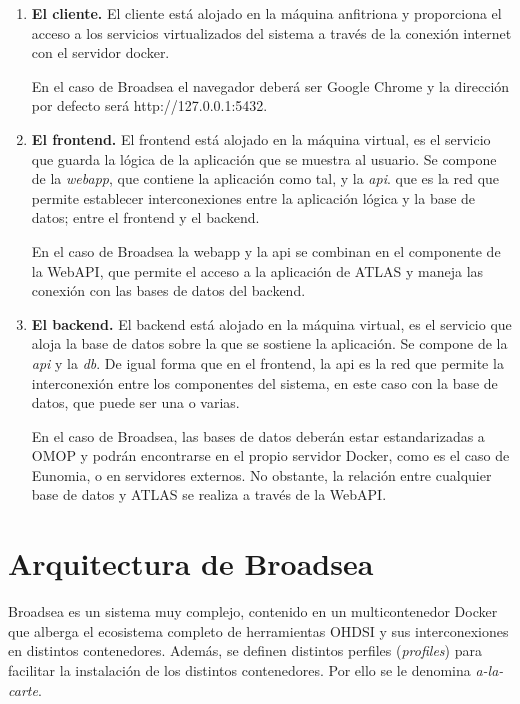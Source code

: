 \begin{enumerate}

    \item \textbf{El cliente.} El cliente está alojado en la máquina anfitriona y proporciona el acceso a los servicios virtualizados del sistema a través de la conexión internet con el servidor docker.

     En el caso de Broadsea el navegador deberá ser Google Chrome y la dirección por defecto será http://127.0.0.1:5432.

    \item \textbf{El frontend.} El frontend está alojado en la máquina virtual, es el servicio que guarda la lógica de la aplicación que se muestra al usuario. Se compone de la \textit{webapp}, que contiene la aplicación como tal, y la \textit{api}. que es la red que permite establecer interconexiones entre la aplicación lógica y la base de datos; entre el frontend y el backend.

    En el caso de Broadsea la webapp y la api se combinan en el componente de la WebAPI, que permite el acceso a la aplicación de ATLAS y maneja las conexión con las bases de datos del backend.

    \item \textbf{El backend.} El backend está alojado en la máquina virtual, es el servicio que aloja la base de datos sobre la que se sostiene la aplicación. Se compone de la \textit{api} y la \textit{db}. De igual forma que en el frontend, la api es la red que permite la interconexión entre los componentes del sistema, en este caso con la base de datos, que puede ser una o varias.

    En el caso de Broadsea, las bases de datos deberán estar estandarizadas a OMOP y podrán encontrarse en el propio servidor Docker, como es el caso de Eunomia, o en servidores externos. No obstante, la relación entre cualquier base de datos y ATLAS se realiza a través de la WebAPI.

    
\end{enumerate}

\section{Arquitectura de Broadsea} \label{sec:08Broadsea}

Broadsea es un sistema muy complejo, contenido en un multicontenedor Docker que alberga el ecosistema completo de herramientas OHDSI y sus interconexiones en distintos contenedores. Además, se definen distintos perfiles (\textit{profiles}) para facilitar la instalación de los distintos contenedores. Por ello se le denomina \textit{a-la-carte}. 

